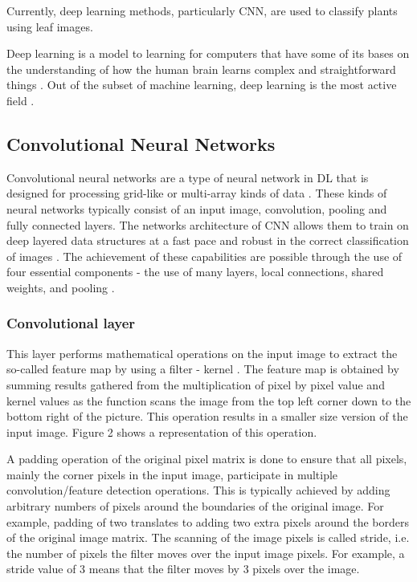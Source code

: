 \documentclass[conference]{IEEEtran}
\begin{document}
Currently, deep learning methods, particularly CNN, are used to classify plants using leaf images.


Deep learning is a model to learning for computers that have some of its bases on the understanding of how the human brain learns complex and straightforward things \cite{wang2017origin}.
Out of the subset of machine learning, deep learning is the most active field \cite{angermueller2016deep}.

\subsection{Convolutional Neural Networks}
Convolutional neural networks are a type of neural network in DL that is designed for processing grid-like or multi-array kinds of data \cite{lecun2015deep,goodfellow2016deep}. These kinds of neural networks typically consist of an input image, convolution, pooling and fully connected layers. The networks architecture of CNN allows them to train on deep layered data structures at a fast pace and robust in the correct classification of images \cite{nielsen2015neural}. The achievement of these capabilities are possible through the use of four essential components - the use of many layers, local connections, shared weights, and pooling \cite{lecun2015deep}.

\subsubsection{Convolutional layer}
This layer performs mathematical operations on the input image to extract the so-called feature map by using a filter - kernel \cite{goodfellow2016deep}. The feature map is obtained by summing results gathered from the multiplication of pixel by pixel value and kernel values as the function scans the image from the top left corner down to the bottom right of the picture. This operation results in a smaller size version of the input image. Figure 2 shows a representation of this operation.

A padding operation of the original pixel matrix is done to ensure that all pixels, mainly the corner pixels in the input image, participate in multiple convolution/feature detection operations. This is typically achieved by adding arbitrary numbers of pixels around the boundaries of the original image. For example, padding of two translates to adding two extra pixels around the borders of the original image matrix. The scanning of the image pixels is called stride, i.e. the number of pixels the filter moves over the input image pixels. For example, a stride value of 3 means that the filter moves by 3 pixels over the image.
\end{document}

